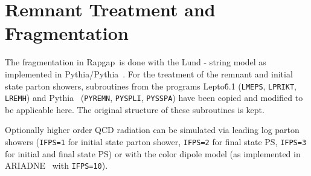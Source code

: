 \documentclass[10pt]{article} \usepackage{dina4}
\newcommand{\PYTHIAMC}{pythia64}
\def\RAPGAP{{\sc Rapgap}}
\def\LEPTO{{\sc Lepto}}
\def\PYTHIA{{\sc Pythia}}
\def\HERWIG{{\sc Herwig}}
\begin{document}
\section{Remnant Treatment and Fragmentation}
The fragmentation in \RAPGAP\ is done with the Lund - string model as 
implemented in \PYTHIA/\PYTHIA\ \cite{\PYTHIAMC}.
 For the treatment of the 
remnant 
and initial state parton showers, subroutines from the 
programs \LEPTO\~6.1 \cite{MEPS} (\verb+LMEPS+, \verb+LPRIKT+, \verb+LREMH+)
and \PYTHIA\ \cite{\PYTHIAMC} (\verb+PYREMN+, \verb+PYSPLI+, \verb+PYSSPA+) 
have been copied 
and 
modified to be applicable here. The original structure of these subroutines
is kept.
\par
 Optionally higher order QCD radiation
can be simulated via leading log parton showers (\verb+IFPS=1+ for initial
state parton shower, \verb+IFPS=2+ for final state PS,
\verb+IFPS=3+ for
initial and final state PS) or with the color dipole model 
(as implemented in  ARIADNE~\cite{CDM} with \verb+IFPS=10+).
\end{document}
